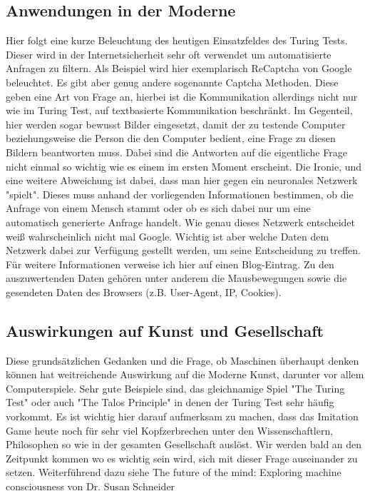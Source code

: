 \subsection{Anwendungen in der Moderne}
Hier folgt eine kurze Beleuchtung des heutigen Einsatzfeldes des Turing Tests. Dieser wird in der Internetsicherheit sehr oft verwendet um automatisierte Anfragen zu filtern. Als Beispiel wird hier exemplarisch ReCaptcha von Google beleuchtet. Es gibt aber genug andere sogenannte Captcha Methoden. Diese geben eine Art von Frage an, hierbei ist die Kommunikation allerdings nicht nur wie im Turing Test, auf textbasierte Kommunikation beschränkt. Im Gegenteil, hier werden sogar bewusst Bilder eingesetzt, damit der zu testende Computer beziehungsweise die Person die den Computer bedient, eine Frage zu diesen Bildern beantworten muss. Dabei sind die Antworten auf die eigentliche Frage nicht einmal so wichtig wie es einem im ersten Moment erscheint. Die Ironie, und eine weitere Abweichung ist dabei, dass man hier gegen ein neuronales Netzwerk "spielt". Dieses muss anhand der vorliegenden Informationen bestimmen, ob die Anfrage von einem Mensch stammt oder ob es sich dabei nur um eine automatisch generierte Anfrage handelt. Wie genau dieses Netzwerk entscheidet weiß wahrscheinlich nicht mal Google. Wichtig ist aber welche Daten dem Netzwerk dabei zur Verfügung gestellt werden, um seine Entscheidung zu treffen. Für weitere Informationen verweise ich hier auf einen Blog-Eintrag\cite{captcha}. Zu den auszuwertenden Daten gehören unter anderem die Mausbewegungen sowie die gesendeten Daten des Browsers (z.B. User-Agent, IP, Cookies).
\subsection{Auswirkungen auf Kunst und Gesellschaft}
Diese grundsätzlichen Gedanken und die Frage, ob Maschinen überhaupt denken können hat weitreichende Auswirkung auf die Moderne Kunst, darunter vor allem Computerspiele. Sehr gute Beispiele sind, das gleichnamige Spiel "The Turing Test" oder auch "The Talos Principle" in denen der Turing Test sehr häufig vorkommt. Es ist wichtig hier darauf aufmerksam zu machen, dass das Imitation Game heute noch für sehr viel Kopfzerbrechen unter den Wissenschaftlern, Philosophen so
wie in der gesamten Gesellschaft auslöst. Wir werden bald an den Zeitpunkt kommen wo es wichtig sein wird, sich mit dieser Frage auseinander zu setzen. Weiterführend dazu siehe The future of the mind: Exploring machine consciousness von Dr. Susan Schneider\cite{explorecons}

